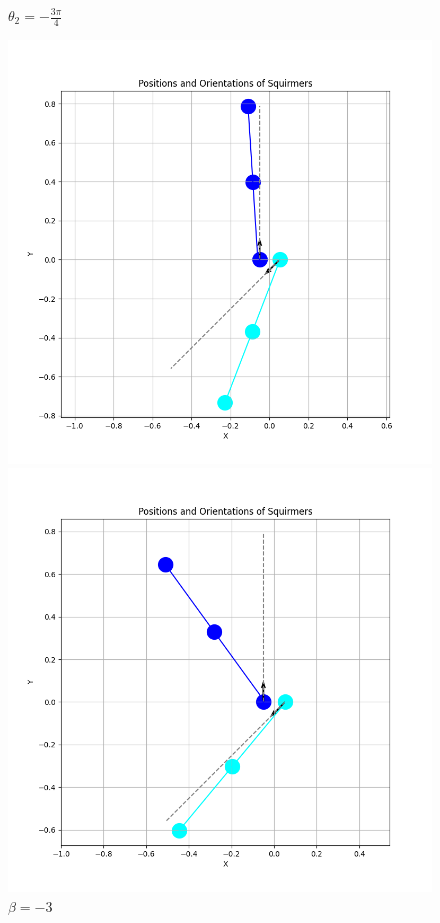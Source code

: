 \documentclass{article}
\begin{document}
\begin{figure}[H]
    \centering
    \textbf{$\theta_2 = -\frac{3\pi}{4}$}\par\medskip
    \begin{minipage}{0.49\textwidth}
        \includegraphics[width=1.1\textwidth]{graphs/simulations/sim_sq_sq/betam3/m3pi_4_.png}
        \caption{\footnotesize $\beta = -3$}
    \end{minipage}\hfill
    \begin{minipage}{0.49\textwidth}
        \includegraphics[width=1.1\textwidth]{graphs/simulations/sim_sq_sq/beta3/m3pi_4_.png}

\end{minipage}
\end{figure}
\end{document}
